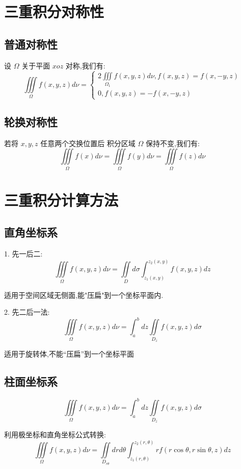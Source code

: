 \section{三重积分对称性}

\subsection{普通对称性}

\begin{definition}
	设 $\Omega$ 关于平面 $xoz$ 对称,我们有: 
	$$\iiint\limits_{\Omega}f(x,y,z)d\nu=\left\lbrace \begin{array}{l}
		2\iiint\limits_{\Omega_{1}}f(x,y,z)d\nu,f(x,y,z)=f(x,-y,z)\\
		0,f(x,y,z)=-f(x,-y,z)
	\end{array}\right. $$
\end{definition}
\subsection{轮换对称性}
\begin{definition}
	若将 $x,y,z$ 任意两个交换位置后 积分区域 $\Omega$ 保持不变,我们有: 
	$$\iiint\limits_{\Omega}f(x)d\nu=\iiint\limits_{\Omega}f(y)d\nu=\iiint\limits_{\Omega}f(z)d\nu$$
\end{definition}

\section{三重积分计算方法}

\subsection{直角坐标系}
\begin{definition}
	1. 先一后二: 
	$$\iiint\limits_{\Omega}f(x,y,z)d\nu=\iint\limits_{D}d\sigma \int_{z_{1}(x,y)}^{z_{2}(x,y)}f(x,y,z)dz$$
	
	适用于空间区域无侧面,能"压扁"到一个坐标平面内.
	
	2. 先二后一法: 
	$$\iiint\limits_{\Omega}f(x,y,z)d\nu=\int_{a}^{b}dz\iint\limits_{D_{z}}f(x,y,z)d\sigma$$
	
	适用于旋转体,不能“压扁”到一个坐标平面
\end{definition}
\subsection{柱面坐标系}
\begin{definition}[柱坐标替换]
	$$\iiint\limits_{\Omega}f(x,y,z)d\nu=\int_{a}^{b}dz\iint\limits_{D_{z}}f(x,y,z)d\sigma$$
	
	利用极坐标和直角坐标公式转换: 
	$$\iiint\limits_{\Omega}f(x,y,z)d\nu=\iint\limits_{D_{r\theta}}drd\theta \int_{z_{1}(r,\theta)}^{z_{2}(r,\theta)}rf(r\cos \theta,r\sin\theta,z)dz$$
\end{definition}
